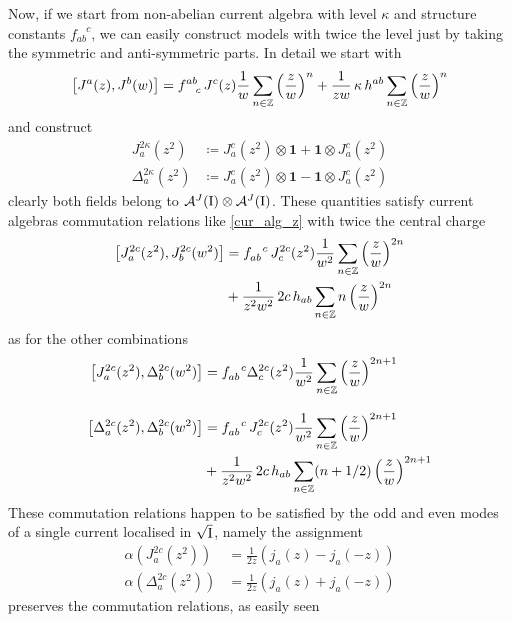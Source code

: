  \bigskip
 Now, if we start from non-abelian current algebra
 with level $\kappa$ and structure constants 
 $f_{ab}^{\phantom{ab}c}$, we can easily construct 
 models with twice the level just by taking
 the symmetric and anti-symmetric parts. In detail we 
 start with \cite{Fuchs:1992}
 \begin{equation}
 \label{cur_alg_z}
 \comm*{J^a(z),J^b(w)}=f^{ab}_{\phantom{ab}c}\,J^c(z)\frac{1}{w}
 \sum_{n\in\Z}\left(\frac{z}{w}\right)^n
 +\frac{1}{zw}\,\kappa\,h^{ab}\sum_{n\in\Z}
 \left(\frac{z}{w}\right)^n
 \end{equation}
 and construct
 \begin{align*}
 J^{2\kappa}_a(z^2)&\coloneqq J^{c}_a(z^2)\otimes\bm{1} +
 \bm{1}\otimes J^{c}_a(z^2)\\
 \Delta^{2\kappa}_a(z^2)&\coloneqq J^{c}_a(z^2)\otimes\bm{1} -
 \bm{1}\otimes J^{c}_a(z^2)
 \end{align*}
 clearly both fields belong to $\mathcal{A}^J(\I)\otimes
 \mathcal{A}^J(\I)$. These quantities satisfy current
 algebras commutation relations like \eqref{cur_alg_z}
 with twice the central charge
 \begin{align*}
 \comm*{J_a^{2c}(z^2),J_b^{2c}(w^2)}&=f_{ab}^{\phantom{ab}c}
 \,J_c^{2c}(z^2)
 \frac{1}{w^2}\sum_{n\in\Z}\left(\frac{z}{w}\right)^{2n}\\
 &+\frac{1}{z^2 w^2}\,2c\,h_{ab}\sum_{n\in\Z}n
 \left(\frac{z}{w}\right)^{2n}
 \end{align*}
 as for the other combinations
 \begin{align*}
 \comm*{J_a^{2c}(z^2),\Delta_b^{2c}(w^2)}&=f_{ab}^{\phantom{ab}c}
 \Delta_c^{2c}(z^2)\frac{1}{w^2}\sum_{n\in\Z}
 \left(\frac{z}{w}\right)^{2n+1}\\[2ex]
 \comm*{\Delta_a^{2c}(z^2),\Delta_b^{2c}(w^2)}&=f_{ab}^{\phantom{ab}c}
 \,J_c^{2c}(z^2)
 \frac{1}{w^2}\sum_{n\in\Z}\left(\frac{z}{w}\right)^{2n+1}\\
 &+\frac{1}{z^2 w^2}\,2c\,h_{ab}\sum_{n\in\Z}(n+1/2)
 \left(\frac{z}{w}\right)^{2n+1}
 \end{align*}
 These commutation relations happen to be satisfied by the 
 odd and even modes of a single current localised in $\sqrt{\I}$,
 namely the assignment
 \begin{align}
 \alpha\left(J_a^{2c}(z^2)\right)&=\frac{1}{2z}
 \left(j_a(z)-j_a(-z)\right)\label{J2c}\\
 \alpha\left(\Delta_a^{2c}(z^2)\right)&=\frac{1}{2z}
 \left(j_a(z)+j_a(-z)\right)\label{delta2c}
 \end{align}
 preserves the commutation relations, as easily seen
